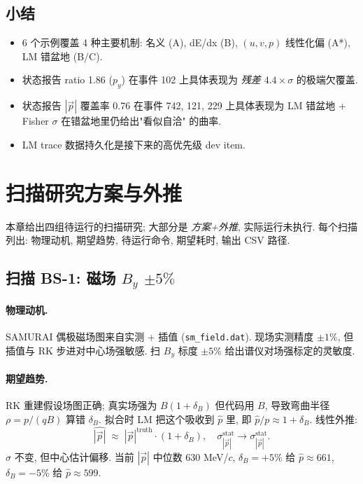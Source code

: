 \subsection{小结}
\label{sec:partIII:case_studies:summary}

\begin{itemize}[nosep]
  \item 6 个示例覆盖 4 种主要机制: 名义 (A), dE/dx (B), $(u, v, p)$ 线性化偏 (A*), LM 错盆地 (B/C).
  \item 状态报告 ratio 1.86 ($p_y$) 在事件 102 上具体表现为 \emph{残差 $4.4 \times \sigma$} 的极端欠覆盖.
  \item 状态报告 $|\vec p|$ 覆盖率 0.76 在事件 742, 121, 229 上具体表现为 LM 错盆地 + Fisher $\sigma$ 在错盆地里仍给出"看似自洽" 的曲率.
  \item LM trace 数据持久化是接下来的高优先级 dev item.
\end{itemize}


\section{扫描研究方案与外推}
\label{sec:partIII:scans}

本章给出四组待运行的扫描研究; 大部分是 \emph{方案+外推}, 实际运行未执行. 每个扫描列出: 物理动机, 期望趋势, 待运行命令, 期望耗时, 输出 CSV 路径.

\subsection{扫描 BS-1: 磁场 $B_y$ $\pm 5\%$}
\label{sec:partIII:scans:bs1}

\paragraph{物理动机.}
SAMURAI 偶极磁场图来自实测 + 插值 (\texttt{sm\_field.dat}). 现场实测精度 $\pm 1\%$, 但插值与 RK 步进对中心场强敏感. 扫 $B_y$ 标度 $\pm 5\%$ 给出谱仪对场强标定的灵敏度.

\paragraph{期望趋势.}
RK 重建假设场图正确; 真实场强为 $B (1 + \delta_B)$ 但代码用 $B$, 导致弯曲半径 $\rho = p / (qB)$ 算错 $\delta_B$. 拟合时 LM 把这个吸收到 $\hat p$ 里, 即 $\hat p / p \approx 1 + \delta_B$. 线性外推:
\[
  \hat{|\vec p|} \;\approx\; |\vec p|^{\mathrm{truth}} \cdot (1 + \delta_B), \quad \sigma_{|\vec p|}^{\mathrm{stat}} \to \sigma_{|\vec p|}^{\mathrm{stat}}.
\]
$\sigma$ 不变, 但中心估计偏移. 当前 $|\vec p|$ 中位数 630 MeV/$c$, $\delta_B = +5\%$ 给 $\hat p \approx 661$, $\delta_B = -5\%$ 给 $\hat p \approx 599$.

